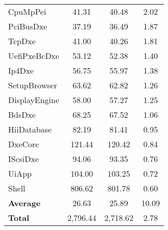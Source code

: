 \begin{longtable}{l c c c}
  CpuMpPei & 41.31 & 40.48 & 2.02\\
  PciBusDxe & 37.19 & 36.49 & 1.87\\
  TcpDxe & 41.00 & 40.26 & 1.81\\
  UefiPxeBcDxe & 53.12 & 52.38 & 1.40\\
  Ip4Dxe & 56.75 & 55.97 & 1.38\\
  SetupBrowser & 63.62 & 62.82 & 1.26\\
  DisplayEngine & 58.00 & 57.27 & 1.25\\
  BdsDxe & 68.25 & 67.52 & 1.06\\
  HiiDatabase & 82.19 & 81.41 & 0.95\\
  DxeCore & 121.44 & 120.42 & 0.84\\
  IScsiDxe & 94.06 & 93.35 & 0.76\\
  UiApp & 104.00 & 103.25 & 0.72\\
  Shell & 806.62 & 801.78 & 0.60\\
  \midrule
  \textbf{Average} & 26.63 & 25.89 & 10.09\\
  \textbf{Total} & 2,796.44 & 2,718.62 & 2.78\\
  \bottomrule
\end{longtable}

